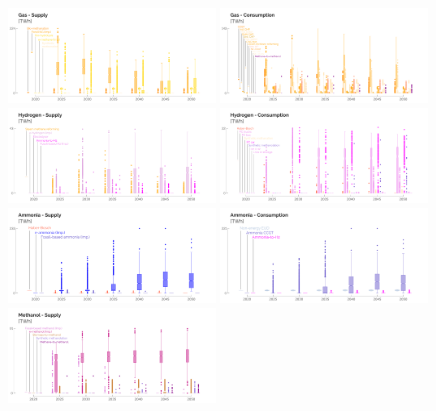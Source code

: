 \documentclass[11pt,twoside,a4paper,english]{article}
\begin{document}
\begin{appendices}
\begin{figure}[!htbp]
\centering
\includegraphics[width=0.49\textwidth]{figures/UQ_Gas_Prod.pdf}
\includegraphics[width=0.49\textwidth]{figures/UQ_Gas_Cons.pdf}
\includegraphics[width=0.49\textwidth]{figures/UQ_H2_Prod.pdf}
\includegraphics[width=0.49\textwidth]{figures/UQ_H2_Cons.pdf}
\includegraphics[width=0.49\textwidth]{figures/UQ_Ammonia_Prod.pdf}
\includegraphics[width=0.49\textwidth]{figures/UQ_Ammonia_Cons.pdf}
\includegraphics[width=0.49\textwidth]{figures/UQ_Methanol_Prod.pdf}

\end{figure}
\end{appendices}
\end{document}
